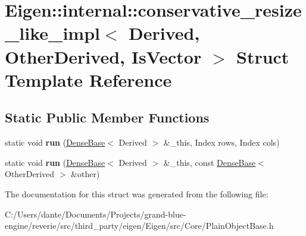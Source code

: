 \hypertarget{struct_eigen_1_1internal_1_1conservative__resize__like__impl}{}\section{Eigen\+::internal\+::conservative\+\_\+resize\+\_\+like\+\_\+impl$<$ Derived, Other\+Derived, Is\+Vector $>$ Struct Template Reference}
\label{struct_eigen_1_1internal_1_1conservative__resize__like__impl}
\subsection*{Static Public Member Functions}
\begin{DoxyCompactItemize}
\item 
\mbox{\label{struct_eigen_1_1internal_1_1conservative__resize__like__impl_af0084305baab7e1026cf70dba792f0b6}} 
static void {\bfseries run} (\mbox{\hyperlink{class_eigen_1_1_dense_base}{Dense\+Base}}$<$ Derived $>$ \&\+\_\+this, Index rows, Index cols)
\item 
\mbox{\label{struct_eigen_1_1internal_1_1conservative__resize__like__impl_afe2945bf1a4b75309e106fb7d361a736}} 
static void {\bfseries run} (\mbox{\hyperlink{class_eigen_1_1_dense_base}{Dense\+Base}}$<$ Derived $>$ \&\+\_\+this, const \mbox{\hyperlink{class_eigen_1_1_dense_base}{Dense\+Base}}$<$ Other\+Derived $>$ \&other)
\end{DoxyCompactItemize}


The documentation for this struct was generated from the following file\+:\begin{DoxyCompactItemize}
\item 
C\+:/\+Users/dante/\+Documents/\+Projects/grand-\/blue-\/engine/reverie/src/third\+\_\+party/eigen/\+Eigen/src/\+Core/Plain\+Object\+Base.\+h\end{DoxyCompactItemize}
